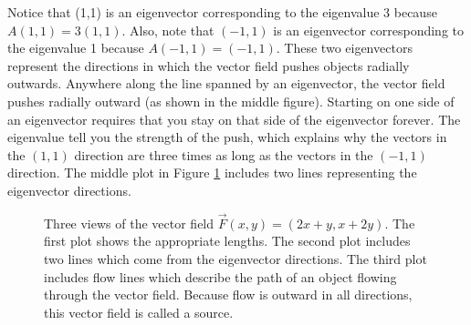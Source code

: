 \begin{example}
Notice that (1,1) is an eigenvector corresponding to the eigenvalue 3 because $A(1,1) = 3(1,1)$. 
Also, note that $(-1,1)$ is an eigenvector corresponding to the eigenvalue 1 because $A(-1,1)=(-1,1)$. 
These two eigenvectors represent the directions in which the vector field pushes objects radially outwards.   
Anywhere along the line spanned by an eigenvector, the vector field pushes radially outward (as shown in the middle figure).  Starting on one side of an eigenvector requires that you stay on that side of the eigenvector forever. 
The eigenvalue tell you the strength of the push, which explains why the vectors in the $(1,1)$ direction are three times as long as the vectors in the $(-1,1)$ direction. 
The middle plot in Figure \ref{vf2112} includes two lines representing the eigenvector directions.

\begin{figure}[bth]
\caption{\label{vf2112} Three views of the vector field $\vec F(x,y) =(2x+y,x+2y)$. The first plot shows the appropriate lengths.  The second plot includes two lines which come from the eigenvector directions. The third plot includes flow lines which describe the path of an object flowing through the vector field. Because flow is outward in all directions, this vector field is called a source.}
\end{figure}


\end{example}
